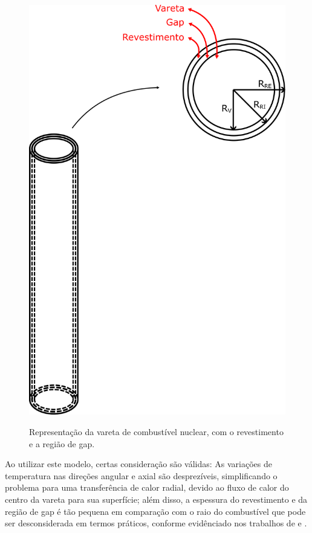 \begin{figure}[H]
    \centering
    \caption{Representação da vareta de combustível nuclear, com o revestimento e a região de gap.}    
    \includegraphics[scale=0.75]{figures/others/cilinder_with_gap.png}
    \label{fig:cilinder_with_gap}
\end{figure}

Ao utilizar este modelo, certas consideração são válidas: As variações de temperatura nas direções angular e axial são desprezíveis, simplificando o problema para uma transferência de calor radial, devido ao fluxo de calor do centro da vareta para sua superfície; além disso, a espessura do revestimento e da região de gap é tão pequena em comparação com o raio do combustível que pode ser desconsiderada em termos práticos, conforme evidênciado nos trabalhos de \citet{soares2017} e \citet{soares2018}.

